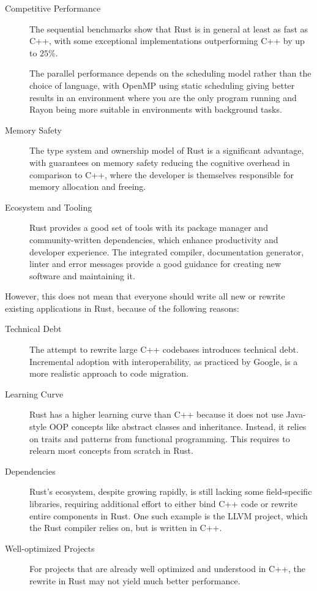\documentclass[11pt,
               a4paper,
               bibtotoc,
               idxtotoc,
               headsepline,
               footsepline,
               footexclude,
               BCOR12mm,
               DIV13,
               openany,   %
               ]
               {scrbook}
\begin{document}
\begin{description}
    \item[Competitive Performance] The sequential benchmarks show that Rust is in general at least as fast as C++, with some exceptional implementations outperforming C++ by up to $25\%$.
    
    The parallel performance depends on the scheduling model rather than the choice of language, with OpenMP using static scheduling giving better results in an environment where you are the only program running and Rayon being more suitable in environments with background tasks.

    \item[Memory Safety] The type system and ownership model of Rust is a significant advantage, with guarantees on memory safety reducing the cognitive overhead in comparison to C++, where the developer is themselves responsible for memory allocation and freeing.

    \item[Ecosystem and Tooling] Rust provides a good set of tools with its package manager and community-written dependencies, which enhance productivity and developer experience. The integrated compiler, documentation generator, linter and error messages provide a good guidance for creating new software and maintaining it.
\end{description}

However, this does not mean that everyone should write all new or rewrite existing applications in Rust, because of the following reasons:

\begin{description}
    \item[Technical Debt] The attempt to rewrite large C++ codebases introduces technical debt. Incremental adoption with interoperability, as practiced by Google, is a more realistic approach to code migration.
    \item[Learning Curve] Rust has a higher learning curve than C++ because it does not use Java-style OOP concepts like abstract classes and inheritance. Instead, it relies on traits and patterns from functional programming. This requires to relearn most concepts from scratch in Rust.
    \item[Dependencies] Rust's ecosystem, despite growing rapidly, is still lacking some field-specific libraries, requiring additional effort to either bind C++ code or rewrite entire components in Rust. One such example is the LLVM project, which the Rust compiler relies on, but is written in C++.
    \item[Well-optimized Projects] For projects that are already well optimized and understood in C++, the rewrite in Rust may not yield much better performance.
\end{description}
\end{document}

